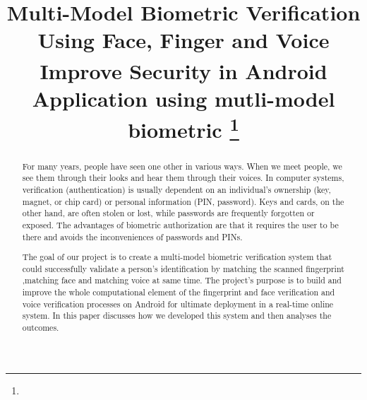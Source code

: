 \documentclass[conference]{IEEEtran}
\begin{document}
\title{Multi-Model Biometric Verification Using Face, Finger and Voice\\
{\footnotesize \textsuperscript{}Improve Security in Android Application using mutli-model biometric}
\thanks{}
}

\author{
\and
{}
\and
{}
}

\maketitle

\begin{abstract}
For many years, people have seen one other in various ways. When we meet people, we see them through their looks and hear them through their voices. In computer systems, verification (authentication) is usually dependent on an individual's ownership (key, magnet, or chip card) or personal information (PIN, password). Keys and cards, on the other hand, are often stolen or lost, while passwords are frequently forgotten or exposed. The advantages of biometric authorization are that it requires the user to be there and avoids the inconveniences of passwords and PINs. 

The goal of our project is to create a multi-model biometric verification system that could successfully validate a person's identification by matching the scanned fingerprint ,matching  face and  matching voice at same time. The project's purpose is to build and improve the whole computational element of the fingerprint and face verification and voice verification processes on Android  for ultimate deployment in a real-time online system. In this paper discusses how we developed this system and then analyses the outcomes.
\end{abstract}
\end{document}

